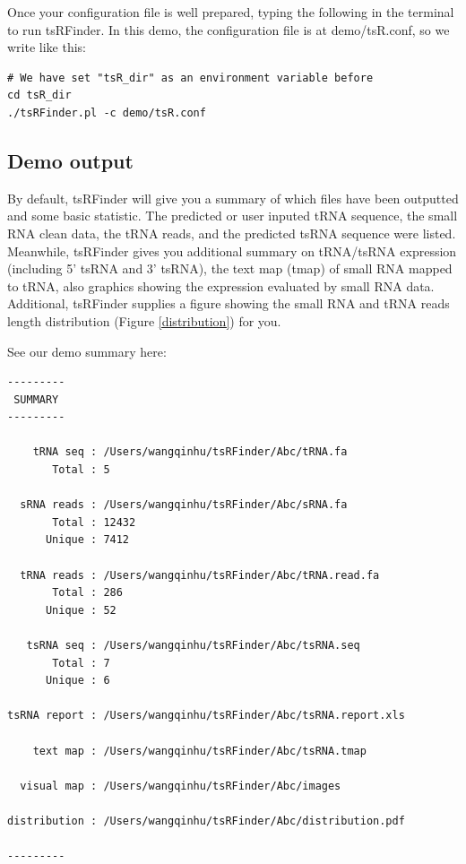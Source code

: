 \documentclass[11pt, a4paper]{article}
\begin{document}
Once your configuration file is well prepared, typing the following in the terminal to run tsRFinder. In this demo, the configuration file is at demo/tsR.conf, so we write like this:

\begin{verbatim}
# We have set "tsR_dir" as an environment variable before
cd tsR_dir
./tsRFinder.pl -c demo/tsR.conf
\end{verbatim}

\subsection{Demo output}

By default, tsRFinder will give you a summary of which files have been outputted and some basic statistic. The predicted or user inputed tRNA sequence, the small RNA clean data, the tRNA reads, and the predicted tsRNA sequence were listed. Meanwhile, tsRFinder gives you additional summary on tRNA/tsRNA expression (including 5' tsRNA and 3' tsRNA), the text map (tmap) of small RNA mapped to tRNA, also graphics showing the expression evaluated by small RNA data. Additional, tsRFinder supplies a figure showing the small RNA and tRNA reads length distribution (Figure \ref{distribution}) for you.

See our demo summary here:

{\small \begin{verbatim}
---------
 SUMMARY 
---------

    tRNA seq : /Users/wangqinhu/tsRFinder/Abc/tRNA.fa
       Total : 5

  sRNA reads : /Users/wangqinhu/tsRFinder/Abc/sRNA.fa
       Total : 12432
      Unique : 7412

  tRNA reads : /Users/wangqinhu/tsRFinder/Abc/tRNA.read.fa
       Total : 286
      Unique : 52

   tsRNA seq : /Users/wangqinhu/tsRFinder/Abc/tsRNA.seq
       Total : 7
      Unique : 6

tsRNA report : /Users/wangqinhu/tsRFinder/Abc/tsRNA.report.xls

    text map : /Users/wangqinhu/tsRFinder/Abc/tsRNA.tmap

  visual map : /Users/wangqinhu/tsRFinder/Abc/images

distribution : /Users/wangqinhu/tsRFinder/Abc/distribution.pdf

---------
\end{verbatim}
}
\end{document}
